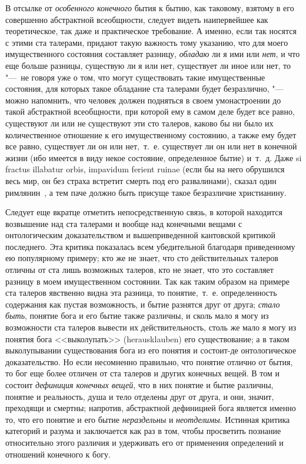 В отсылке от {\em особенного конечного} бытия к бытию,
как таковому, взятому в его совершенно абстрактной всеобщности, следует
видеть наипервейшее как теоретическое, так даже и практическое требование.
А именно, если так носятся с этими ста талерами, придают такую важность
тому указанию, что для моего имущественного состояния составляет разницу,
{\em обладаю} ли я ими или
{\em нет}, и что еще больше разницы, существую ли я или
нет, существует ли иное или нет, то "---~не говоря уже о том, что могут
существовать такие имущественные состояния, для которых такое обладание ста
талерами будет безразлично, "--- можно напомнить, что человек должен подняться
в своем умонастроении до такой абстрактной всеобщности,
при которой ему в самом деле будет все равно, существуют ли или не
существуют эти сто талеров, каково бы ни было их количественное отношение к
его имущественному состоянию, а также ему будет все равно, существует ли он
или нет,~т.~е. существует ли он или нет в конечной жизни (ибо имеется в
виду некое состояние, определенное бытие) и~т.~д. Даже si fractus illabatur
orbis, impavidum ferient ruinae (если бы на него обрушился весь мир, он без
страха встретит смерть под его развалинами), сказал один
римлянин~, а тем паче должно быть присуще такое
безразличие христианину.

Следует еще вкратце отметить непосредственную связь, в которой находится
возвышение над ста талерами и вообще над конечными вещами с онтологическим
доказательством и вышеприведенной кантовской критикой последнего. Эта
критика показалась всем убедительной благодаря приведенному ею популярному
примеру; кто же не знает, что сто действительных талеров отличны от ста
лишь возможных талеров, кто не знает, что это составляет разницу в моем
имущественном состоянии. Так как таким образом на примере ста талеров
явственно видна эта разница, то понятие,~т.~е. определенность содержания
как пустая возможность, и бытие разнятся друг от друга;
{\em стало быть}, понятие бога и его бытие также
различны, и сколь мало я могу из возможности ста талеров вывести их
действительность, столь же мало я могу из понятия бога <<выколупать>>
(herausklauben) его существование; а в таком выколупывании существования
бога из его понятия и состоит-де онтологическое доказательство. Но если
несомненно правильно, что понятие отлично от бытия, то бог еще более
отличен от ста талеров и других конечных вещей. В том и состоит
{\em дефиниция конечных вещей}, что в них понятие и
бытие различны, понятие и реальность, душа и тело отделены друг от друга, и
они, значит, преходящи и смертны; напротив, абстрактной дефиницией бога
является именно то, что его понятие и его бытие
{\em нераздельны} и
{\em неотделимы}. Истинная критика категорий и разума и
заключается как раз в том, чтобы просветить познание относительно этого
различия и удерживать его от применения определений и отношений конечного к
богу.\label{bkm:bm85b}

